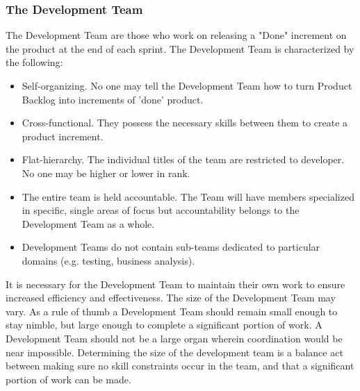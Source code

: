\subsubsection{The Development Team}


The Development Team are those who work on releasing a "Done" increment on the product at
the end of each sprint\cite{scrumguide11}. The Development Team is characterized by the
following:


\begin{itemize}
	\item Self-organizing. No one may tell the Development Team how to turn Product Backlog
into increments of 'done' product.
	\item	Cross-functional. They possess the necessary skills between them to create a product
increment.
	\item	Flat-hierarchy. The individual titles of the team are restricted to developer. No
one may be higher or lower in rank.
	\item	The entire team is held accountable. The Team will have members specialized in
specific, single areas of focus but accountability belongs to the Development Team as a
whole.
	\item	Development Teams do not contain sub-teams dedicated to particular domains (e.g.
testing, business analysis).
\end{itemize}


It is necessary for the Development Team to maintain their own work to ensure increased
efficiency and effectiveness\cite{scrumguide11}.
The size of the Development Team may vary. As a rule of thumb a Development Team should
remain small enough to stay nimble, but large enough to complete a significant portion of
work\cite{scrumguide11}. A Development Team should not be a large organ wherein coordination
would be near impossible\cite{scrumguide11}. Determining the size of the development team is
a balance act between making sure no skill constraints occur in the team, and that a
significant portion of work can be made\cite{scrumguide11}.